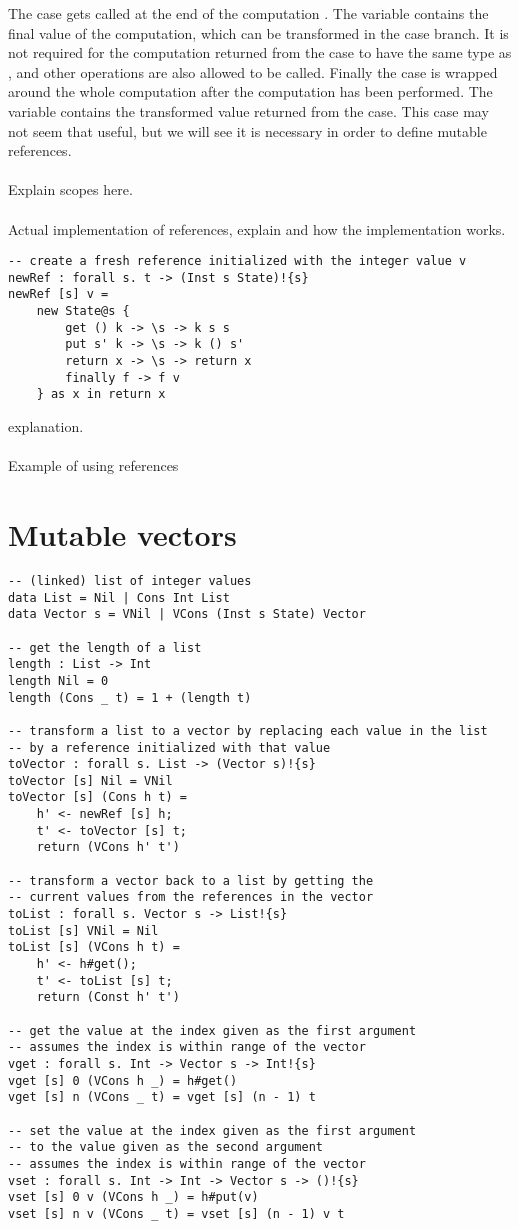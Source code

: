 The  case gets called at the end of the computation .
The variable  contains the final value of the computation, which can be transformed in the case branch.
It is not required for the computation returned from the case to have the same type as , and other operations are also allowed to be called.
Finally the  case is wrapped around the whole computation  after the  computation has been performed.
The variable  contains the transformed value returned from the  case.
This case may not seem that useful, but we will see it is necessary in order to define mutable references.
\\\\
Explain scopes here.
\\\\
Actual implementation of references, explain \ident{[s]} and how the implementation works.

\begin{verbatim}
-- create a fresh reference initialized with the integer value v
newRef : forall s. t -> (Inst s State)!{s}
newRef [s] v =
	new State@s {
		get () k -> \s -> k s s
		put s' k -> \s -> k () s'
		return x -> \s -> return x
		finally f -> f v
	} as x in return x
\end{verbatim}
explanation.
\\\\
Example of using references

\section{Mutable vectors}
\begin{verbatim}
-- (linked) list of integer values
data List = Nil | Cons Int List
data Vector s = VNil | VCons (Inst s State) Vector

-- get the length of a list
length : List -> Int
length Nil = 0
length (Cons _ t) = 1 + (length t)

-- transform a list to a vector by replacing each value in the list
-- by a reference initialized with that value
toVector : forall s. List -> (Vector s)!{s}
toVector [s] Nil = VNil
toVector [s] (Cons h t) =
	h' <- newRef [s] h;
	t' <- toVector [s] t;
	return (VCons h' t')

-- transform a vector back to a list by getting the
-- current values from the references in the vector
toList : forall s. Vector s -> List!{s}
toList [s] VNil = Nil
toList [s] (VCons h t) =
	h' <- h#get();
	t' <- toList [s] t;
	return (Const h' t')

-- get the value at the index given as the first argument
-- assumes the index is within range of the vector
vget : forall s. Int -> Vector s -> Int!{s}
vget [s] 0 (VCons h _) = h#get()
vget [s] n (VCons _ t) = vget [s] (n - 1) t

-- set the value at the index given as the first argument
-- to the value given as the second argument
-- assumes the index is within range of the vector
vset : forall s. Int -> Int -> Vector s -> ()!{s}
vset [s] 0 v (VCons h _) = h#put(v)
vset [s] n v (VCons _ t) = vset [s] (n - 1) v t
\end{verbatim}

